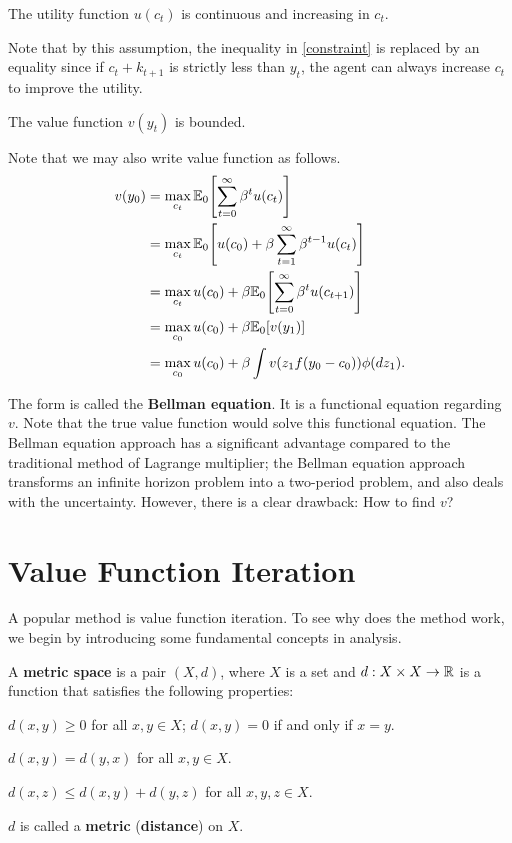 \documentclass[12pt]{article}
\begin{document}
\begin{assumption}
    The utility function $u(c_t)$ is continuous and increasing in 
    $c_t$.
\end{assumption}

Note that by this assumption, the inequality in \eqref{constraint} 
is replaced by an equality since if $c_t + k_{t+1}$ is strictly less 
than $y_t$, the agent can always increase $c_t$ to improve the 
utility. 

\begin{assumption}
    The value function $v(y_t)$ is bounded.
\end{assumption}

Note that we may also write value function as follows. 
\begin{equation}
    \begin{split}
        v(y_0) 
        &= \max_{c_t} \E_0\sbrc{\sum_{t=0}^{\infty} \beta^t u(c_t)}\\
        &= \max_{c_t} \E_0\sbrc{u(c_0) + \beta\sum_{t=1}^{\infty} \beta^{t-1} u(c_t)}\\
        &= \max_{c_t} u(c_0) + \beta\E_0\sbrc{\sum_{t=0}^{\infty} \beta^{t} u(c_{t+1})}\\ 
        &= \max_{c_0} u(c_0) + \beta\E_0\sbrc{v(y_1)}\\
        &= \max_{c_0} u(c_0) + \beta\int v(z_1f(y_0-c_0))\phi(dz_1).
    \end{split}
\end{equation}

The form is called the \textbf{Bellman equation}. It is a functional 
equation regarding $v$. Note that the true value function would solve 
this functional equation. The Bellman equation approach 
has a significant advantage compared to the traditional method of 
Lagrange multiplier; the Bellman equation approach transforms an 
infinite horizon problem into a two-period problem, and also deals 
with the uncertainty. However, there is a clear drawback: How to find 
$v$? 

\section{Value Function Iteration} 
A popular method is value function iteration. To see why does the 
method work, we begin by introducing some fundamental concepts in 
analysis. 

\begin{definition}
    A \textbf{metric space} is a pair $(X, d)$, where $X$ is a set 
    and $d: X \times X \to \mathbb{R}$ is a function that satisfies the 
    following properties: 
    \begin{thmenum}
        \item $d(x, y) \geq 0$ for all $x, y \in X$; $d(x, y) = 0$ 
        if and only if $x = y$.
        \item $d(x, y) = d(y, x)$ for all $x, y \in X$.
        \item $d(x, z) \leq d(x, y) + d(y, z)$ for all $x, y, z \in X$.
    \end{thmenum}
    $d$ is called a \textbf{metric} (\textbf{distance}) on $X$.
\end{definition}
\end{document}

